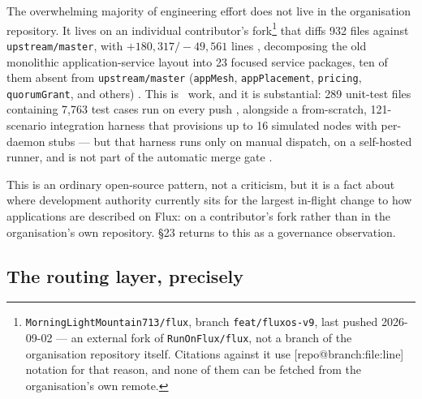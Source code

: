 The overwhelming majority of  engineering effort does not live in the organisation
repository. It lives on an individual contributor's fork\footnote{\texttt{MorningLightMountain713/\allowbreak{}flux},
branch \texttt{feat/fluxos-v9}, last pushed 2026-09-02 — an external fork of \texttt{RunOnFlux/flux},
not a branch of the organisation repository itself. Citations against it use
\textsf{[repo@branch:file:line]} notation for that reason, and none of them can be fetched from the
organisation's own remote.} that diffs 932 files against \texttt{upstream/\allowbreak{}master}, with
$+180{,}317/-49{,}561$ lines
,
decomposing the old monolithic application-service layout into 23 focused service
packages, ten of them absent from \texttt{upstream/\allowbreak{}master} (\texttt{appMesh}, \texttt{appPlacement}, \texttt{pricing},
\texttt{quorumGrant}, and others)
.
This is \inprogress\ work, and it is substantial: 289 unit-test files containing 7{,}763 test cases
run on every push
,
alongside a from-scratch, 121-scenario integration harness that provisions up to 16 simulated nodes
with per-daemon stubs
— but that harness runs only on manual dispatch, on a self-hosted runner, and is not part of the
automatic merge gate
.

This is an ordinary open-source pattern, not a criticism, but it is a fact about where development
authority currently sits for the largest in-flight change to how applications are described on
Flux: on a contributor's fork rather than in the organisation's own repository. \S23 returns to
this as a governance observation.

\subsection{The routing layer, precisely}

